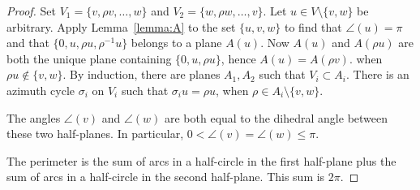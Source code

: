 \begin{proof}   Set $V_1 = \{v,\rho v,\ldots,w\}$ and $V_2 = \{w,\rho w,\ldots,v\}$. 
Let $u\in V\setminus\{v,w\}$ be arbitrary.
Apply Lemma~\ref{lemma:A} to the set $\{u,v,w\}$ to find that $\angle(u)=\pi$ and
that $\{0,u,\rho u,\rho^{-1} u\}$ belongs to a plane $A(u)$.  Now $A(u)$ and $A(\rho u)$ are both the unique plane containing $\{0,u,\rho u\}$, hence $A(u) = A(\rho v)$.  
when $\rho u\not\in \{v,w\}$.  By induction, there are planes $A_1, A_2$ such that $V_i\subset A_i$.  There is
an azimuth cycle $\sigma_i$ on $V_i$ such that $\sigma_i u = \rho u$, when $\rho \in A_i\setminus \{v,w\}$.  

The angles $\angle(v)$ and $\angle(w)$ are both equal to the dihedral angle between these two half-planes.  In particular, $0<\angle(v)=\angle(w)\le\pi$.
%

The perimeter is the sum of arcs in a half-circle in the first half-plane plus
the sum of arcs in a half-circle in the second half-plane. This sum is $2\pi$.
\end{proof}




